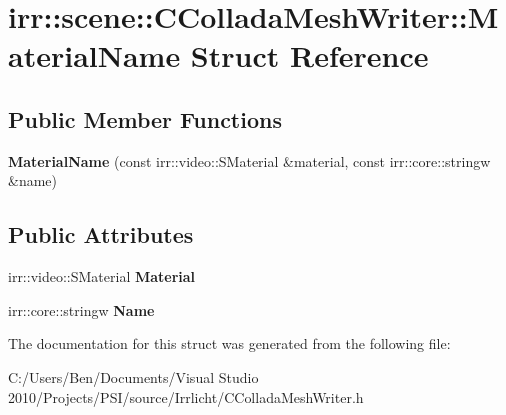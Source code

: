 \hypertarget{structirr_1_1scene_1_1_c_collada_mesh_writer_1_1_material_name}{\section{irr\-:\-:scene\-:\-:C\-Collada\-Mesh\-Writer\-:\-:Material\-Name Struct Reference}
\label{structirr_1_1scene_1_1_c_collada_mesh_writer_1_1_material_name}
}
\subsection*{Public Member Functions}
\begin{DoxyCompactItemize}
\item 
\hypertarget{structirr_1_1scene_1_1_c_collada_mesh_writer_1_1_material_name_abe0d618ab8707a8b169bbfffd2689c29}{{\bfseries Material\-Name} (const irr\-::video\-::\-S\-Material \&material, const irr\-::core\-::stringw \&name)}\label{structirr_1_1scene_1_1_c_collada_mesh_writer_1_1_material_name_abe0d618ab8707a8b169bbfffd2689c29}

\end{DoxyCompactItemize}
\subsection*{Public Attributes}
\begin{DoxyCompactItemize}
\item 
\hypertarget{structirr_1_1scene_1_1_c_collada_mesh_writer_1_1_material_name_a20111b869ff3b80c7f8c629c1ef87786}{irr\-::video\-::\-S\-Material {\bfseries Material}}\label{structirr_1_1scene_1_1_c_collada_mesh_writer_1_1_material_name_a20111b869ff3b80c7f8c629c1ef87786}

\item 
\hypertarget{structirr_1_1scene_1_1_c_collada_mesh_writer_1_1_material_name_a583d3d1550aefb3b916fa83b3f1c7e93}{irr\-::core\-::stringw {\bfseries Name}}\label{structirr_1_1scene_1_1_c_collada_mesh_writer_1_1_material_name_a583d3d1550aefb3b916fa83b3f1c7e93}

\end{DoxyCompactItemize}


The documentation for this struct was generated from the following file\-:\begin{DoxyCompactItemize}
\item 
C\-:/\-Users/\-Ben/\-Documents/\-Visual Studio 2010/\-Projects/\-P\-S\-I/source/\-Irrlicht/C\-Collada\-Mesh\-Writer.\-h\end{DoxyCompactItemize}

